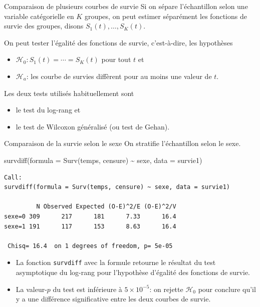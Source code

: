 \documentclass[
  ignorenonframetext,
]{beamer}
\newenvironment{Shaded}{\begin{snugshade}}{\end{snugshade}}
\newcommand{\AttributeTok}[1]{\textcolor[rgb]{0.40,0.45,0.13}{#1}}
\newcommand{\FunctionTok}[1]{\textcolor[rgb]{0.28,0.35,0.67}{#1}}
\newcommand{\NormalTok}[1]{\textcolor[rgb]{0.00,0.23,0.31}{#1}}
\newcommand{\SpecialCharTok}[1]{\textcolor[rgb]{0.37,0.37,0.37}{#1}}
\providecommand{\tightlist}{%
  \setlength{\itemsep}{0pt}\setlength{\parskip}{0pt}}
\begin{document}
\begin{frame}{Comparaison de plusieurs courbes de survie}
\protect{}\label{comparaison-de-plusieurs-courbes-de-survie}
Si on sépare l'échantillon selon une variable catégorielle en \(K\)
groupes, on peut estimer séparément les fonctions de survie des groupes,
disons \(S_1(t), \ldots, S_K(t)\).

On peut tester l'égalité des fonctions de survie, c'est-à-dire, les
hypothèses

\begin{itemize}
\tightlist
\item
  \(\mathscr{H}_0: S_1(t) = \cdots = S_K(t)\) pour tout \(t\) et
\item
  \(\mathscr{H}_a\): les courbe de survies diffèrent pour au moins une
  valeur de \(t\).
\end{itemize}

Les deux tests utilisés habituellement sont

\begin{itemize}
\tightlist
\item
  le test du log-rang et
\item
  le test de Wilcoxon généralisé (ou test de Gehan).
\end{itemize}
\end{frame}

\begin{frame}[fragile]{Comparaison de la survie selon le sexe}
\protect{}\label{comparaison-de-la-survie-selon-le-sexe}
On stratifie l'échantillon selon le sexe.

\begin{Shaded}
\begin{Highlighting}[numbers=left,,]
\FunctionTok{survdiff}\NormalTok{(}\AttributeTok{formula =} \FunctionTok{Surv}\NormalTok{(temps, censure) }\SpecialCharTok{\textasciitilde{}}\NormalTok{ sexe, }
         \AttributeTok{data =}\NormalTok{ survie1)}
\end{Highlighting}
\end{Shaded}

\begin{verbatim}
Call:
survdiff(formula = Surv(temps, censure) ~ sexe, data = survie1)

         N Observed Expected (O-E)^2/E (O-E)^2/V
sexe=0 309      217      181      7.33      16.4
sexe=1 191      117      153      8.63      16.4

 Chisq= 16.4  on 1 degrees of freedom, p= 5e-05 
\end{verbatim}

\footnotesize

\begin{itemize}
\tightlist
\item
  La fonction \texttt{survdiff} avec la formule retourne le résultat du
  test asymptotique du log-rang pour l'hypothèse d'égalité des fonctions
  de survie.
\item
  La valeur-\(p\) du test est inférieure à \(5 \times 10^{-5}\): on
  rejette \(\mathscr{H}_0\) pour conclure qu'il y a une différence
  significative entre les deux courbes de survie.
\end{itemize}
\end{frame}
\end{document}
